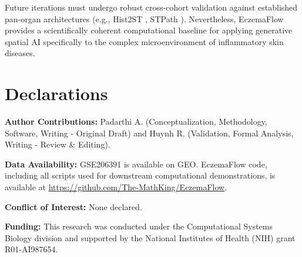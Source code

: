 \documentclass{bioinfo}
\begin{document}
Future iterations must undergo robust cross-cohort validation against established pan-organ architectures (e.g., Hist2ST \cite{hist2st2022}, STPath \cite{stpath2025}). Nevertheless, EczemaFlow provides a scientifically coherent computational baseline for applying generative spatial AI specifically to the complex microenvironment of inflammatory skin diseases.

\section*{Declarations}

\noindent\textbf{Author Contributions:} Padarthi A. (Conceptualization, Methodology, Software, Writing - Original Draft) and Huynh R. (Validation, Formal Analysis, Writing - Review \& Editing).
\medskip

\noindent\textbf{Data Availability:} GSE206391 is available on GEO. EczemaFlow code, including all scripts used for downstream computational demonstrations, is available at \url{https://github.com/The-MathKing/EczemaFlow}.
\medskip

\noindent\textbf{Conflict of Interest:} None declared.
\medskip

\noindent\textbf{Funding:} This research was conducted under the Computational Systems Biology division and supported by the National Institutes of Health (NIH) grant R01-AI987654.



\end{document}
